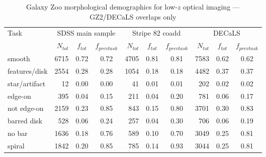 \documentclass[iop,apj,tighten]{emulateapj}
\begin{document}
\begin{table*}
\centering
\caption{Galaxy Zoo morphological demographics for low-$z$ optical imaging --- GZ2/DECaLS overlaps only}\label{tbl:overlaps}
\begin{tabular}{l|rcc|rcc|rcc}
\hline\hline
    Task & \multicolumn{3}{c}{SDSS main sample} & \multicolumn{3}{c}{Stripe 82 coadd} & \multicolumn{3}{c}{DECaLS} \\
    
    & $N_{tot}$ & $f_{tot}$ & $f_{prev task}$ & $N_{tot}$ & $f_{tot}$ & $f_{prev task}$ & $N_{tot}$ & $f_{tot}$ & $f_{prev task}$ \\
    \hline
    
    smooth                  &   6715 & 0.72 & 0.72 &   4705 & 0.81 & 0.81       &   7583 & 0.62 & 0.62                                                    \\
    features/disk           &   2554 & 0.28 & 0.28 &   1054 & 0.18 & 0.18       &   4482 & 0.37 & 0.37                                                    \\
    star/artifact           &     12 & 0.00 & 0.00 &     41 & 0.01 & 0.01       &    202 & 0.02 & 0.02                                                    \\
    \hline                                                                                                                                         
    edge-on                 &    395 & 0.04 & 0.15 &    211 & 0.04 & 0.20       &    781 & 0.06 & 0.17                                                    \\
    not edge-on             &   2159 & 0.23 & 0.85 &    843 & 0.15 & 0.80       &   3701 & 0.30 & 0.83                                                    \\
    \hline                                                                                                                                         
    barred disk             &    528 & 0.06 & 0.24 &    257 & 0.04 & 0.30       &    706 & 0.06 & 0.19                                                    \\
    no bar                  &   1636 & 0.18 & 0.76 &    589 & 0.10 & 0.70       &   3049 & 0.25 & 0.81                                                    \\
    \hline                                                                                                                                         
    spiral                  &   1842 & 0.20 & 0.85 &    785 & 0.14 & 0.93       &   3044 & 0.25 & 0.81                                                    \\

\end{tabular}
\end{table*}
\end{document}
